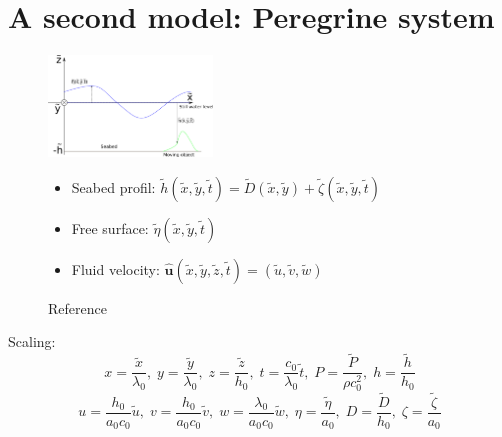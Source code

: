 \documentclass[compress,t]{beamer}
\begin{document}
	\section{A second model: Peregrine system}
  			\begin{frame}
 				\begin{figure}
 					\begin{minipage}[t]{0.3\linewidth}
 						\includegraphics[height=2.7cm]{CartesianCoordinates}
						\caption{Reference}
 					\end{minipage} \hfill
 					\begin{minipage}[b]{0.6\linewidth}
 						\begin{itemize}
							\item Seabed profil: $\tilde h(\tilde x,\tilde y,\tilde t) = \tilde D(\tilde x,\tilde y) +\tilde  \zeta(\tilde x,\tilde y,\tilde t)$
							\item Free surface: $\tilde{\eta}(\tilde x,\tilde y,\tilde t)$
							\item Fluid velocity: $\hat{\mathbf{u}}(\tilde x,\tilde y,\tilde z,\tilde t)=(\tilde u,\tilde v,\tilde w)$
						\end{itemize}
 					\end{minipage}
				\end{figure}
				\pause
				Scaling: 
  				\begin{equation*}
					x = \frac{\tilde{x}}{\lambda_0},\; 
					y = \frac{\tilde{y}}{\lambda_0}, \;
					z = \frac{\tilde{z}}{h_0}, \; 
					t = \frac{c_0}{\lambda_0}\tilde{t},\;
					P = \dfrac{\tilde{P}}{\rho c_0^2},\;
					h = \dfrac{\tilde{h}}{h_0}	
				\end{equation*}
				\begin{equation*}
					u = \frac{h_0}{a_0 c_0} \tilde{u},\;
					v = \dfrac{h_0}{a_0 c_0} \tilde{v},\;
					w = \dfrac{\lambda_0}{a_0 c_0} \tilde{w},\; 
					\eta = \dfrac{\tilde{\eta}}{a_0},\;
					D = \dfrac{\tilde{D}}{h_0}, \;
					\zeta = \dfrac{\tilde{\zeta}}{a_0}			
				\end{equation*}
			\end{frame}
 	
\end{document}
